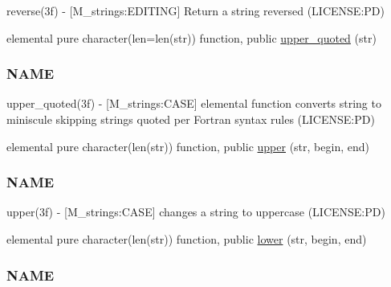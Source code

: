 \begin{DoxyCompactItemize}
\begin{DoxyCompactList}
reverse(3f) -\/ \mbox{[}M\+\_\+strings\+:E\+D\+I\+T\+I\+NG\mbox{]} Return a string reversed (L\+I\+C\+E\+N\+SE\+:PD) \end{DoxyCompactList}\item 
elemental pure character(len=len(str)) function, public \mbox{\hyperlink{namespacem__strings_a3bd3b1de054c81fcc18b69afc369fb21}{upper\+\_\+quoted}} (str)
\begin{DoxyCompactList}\small\item\em \subsubsection*{N\+A\+ME}

upper\+\_\+quoted(3f) -\/ \mbox{[}M\+\_\+strings\+:C\+A\+SE\mbox{]} elemental function converts string to miniscule skipping strings quoted per Fortran syntax rules (L\+I\+C\+E\+N\+SE\+:PD) \end{DoxyCompactList}\item 
elemental pure character(len(str)) function, public \mbox{\hyperlink{namespacem__strings_a0953ac5c4d31339fdd8ec3acc9c3c915}{upper}} (str, begin, end)
\begin{DoxyCompactList}\small\item\em \subsubsection*{N\+A\+ME}

upper(3f) -\/ \mbox{[}M\+\_\+strings\+:C\+A\+SE\mbox{]} changes a string to uppercase (L\+I\+C\+E\+N\+SE\+:PD) \end{DoxyCompactList}\item 
elemental pure character(len(str)) function, public \mbox{\hyperlink{namespacem__strings_a3c7d4be9051206e4b2f72112f9fdc3b4}{lower}} (str, begin, end)
\begin{DoxyCompactList}\small\item\em \subsubsection*{N\+A\+ME}


\end{DoxyCompactList}
\end{DoxyCompactItemize}
